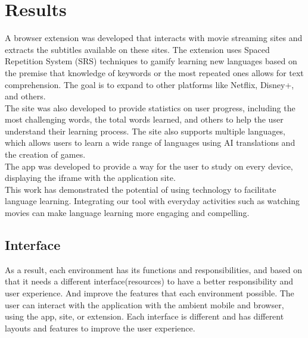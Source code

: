 \documentclass[12pt]{article}
\begin{document}
\section{Results}
A browser extension was developed that interacts with movie streaming sites and extracts the subtitles available on these sites. The extension uses Spaced Repetition System (SRS) techniques to gamify learning new languages based on the premise that knowledge of keywords or the most repeated ones allows for text comprehension. The goal is to expand to other platforms like Netflix, Disney+, and others. \\ 
The site was also developed to provide statistics on user progress, including the most challenging words, the total words learned, and others to help the user understand their learning process. The site also supports multiple languages, which allows users to learn a wide range of languages using AI translations and the creation of games.  \\
The app was developed to provide a way for the user to study on every device, displaying the iframe with the application site.\\
This work has demonstrated the potential of using technology to facilitate language learning. Integrating our tool with everyday activities such as watching movies can make language learning more engaging and compelling. 
\subsection{Interface}
As a result, each environment has its functions and responsibilities, and based on that it needs a different interface(resources) to have a better responsibility and user experience. And improve the features that each environment possible. The user can interact with the application with the ambient mobile and browser, using the app, site, or extension. Each interface is different and has different layouts and features to improve the user experience. 
\end{document}
